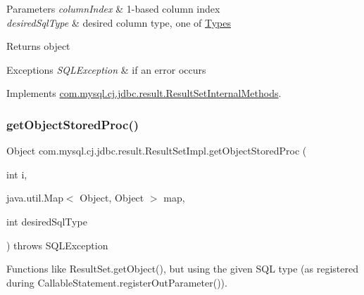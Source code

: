 \begin{DoxyParams}{Parameters}
{\em column\+Index} & 1-\/based column index \\
\hline
{\em desired\+Sql\+Type} & desired column type, one of \mbox{\hyperlink{}{Types}} \\
\hline
\end{DoxyParams}
\begin{DoxyReturn}{Returns}
object 
\end{DoxyReturn}

\begin{DoxyExceptions}{Exceptions}
{\em S\+Q\+L\+Exception} & if an error occurs \\
\hline
\end{DoxyExceptions}


Implements \mbox{\hyperlink{interfacecom_1_1mysql_1_1cj_1_1jdbc_1_1result_1_1_result_set_internal_methods_a2a06ef27f3e32523ff5d6b8e04f7586b}{com.\+mysql.\+cj.\+jdbc.\+result.\+Result\+Set\+Internal\+Methods}}.

\mbox{\label{classcom_1_1mysql_1_1cj_1_1jdbc_1_1result_1_1_result_set_impl_a70dfce90a5b666ec4699ca1b91a7a713}} 
\subsubsection{\texorpdfstring{get\+Object\+Stored\+Proc()}{getObjectStoredProc()}\hspace{0.1cm}{\footnotesize\ttfamily [2/4]}}
{\footnotesize\ttfamily Object com.\+mysql.\+cj.\+jdbc.\+result.\+Result\+Set\+Impl.\+get\+Object\+Stored\+Proc (\begin{DoxyParamCaption}\item[{int}]{i,  }\item[{java.\+util.\+Map$<$ Object, Object $>$}]{map,  }\item[{int}]{desired\+Sql\+Type }\end{DoxyParamCaption}) throws S\+Q\+L\+Exception}

Functions like Result\+Set.\+get\+Object(), but using the given S\+QL type (as registered during Callable\+Statement.\+register\+Out\+Parameter()).


